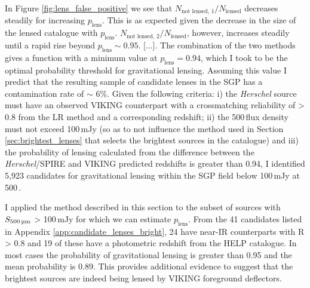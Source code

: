 In Figure \ref{fig:lens_false_positive} we see that $N_{\textrm{not lensed, 1}}/N_{\textrm{lensed}}$ decreases steadily for increasing $p_{\textrm{lens}}$. This is as expected given the decrease in the size of the lensed catalogue with $p_{\textrm{lens}}$. $N_{\textrm{not lensed, 2}}/N_{\textrm{lensed}}$, however, increases steadily until a rapid rise beyond $p_\textrm{lens} \sim 0.95$. [...]. The combination of the two methods gives a function with a minimum value at $p_\textrm{lens} = 0.94$, which I took to be the optimal probability threshold for gravitational lensing. Assuming this value I predict that the resulting sample of candidate lenses in the SGP has a contamination rate of $\sim$ 6\%. Given the following criteria: i) the \textit{Herschel} source must have an observed VIKING counterpart with a crossmatching reliability of > 0.8 from the LR method and a corresponding redshift; ii) the 500\,\micron flux density must not exceed 100\,mJy (so as to not influence the method used in Section \ref{sec:brightest_lenses} that selects the brightest sources in the catalogue) and iii) the probability of lensing calculated from the difference between the \textit{Herschel}/SPIRE and VIKING predicted redshifts is greater than 0.94, I identified 5,923 candidates for gravitational lensing within the SGP field below 100\,mJy at 500\,\micron.

I applied the method described in this section to the subset of sources with $S_{\textrm{500\,\micron}}$ > 100\,mJy for which we can estimate $p_\textrm{lens}$. From the 41 candidates listed in Appendix \ref{app:candidate_lenses_bright}, 24 have near-IR counterparts with R > 0.8 and 19 of these have a photometric redshift from the HELP catalogue. In most cases the probability of gravitational lensing is greater than 0.95 and the mean probability is 0.89. This provides additional evidence to suggest that the brightest sources are indeed being lensed by VIKING foreground deflectors.

